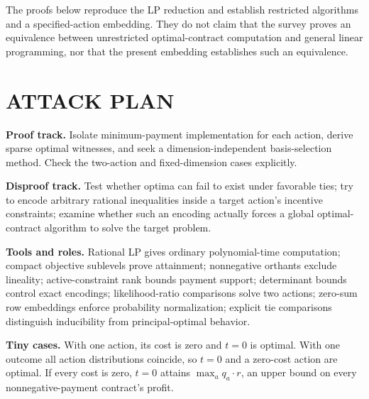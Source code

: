 \documentclass[11pt,a4paper]{article}
\theoremstyle{definition}\newtheorem{definition}[theorem]{Definition}
\theoremstyle{remark}\newtheorem{remark}[theorem]{Remark}
\newcommand{\1}{\mathbf 1}
\begin{document}
The proofs below reproduce the LP reduction and establish restricted algorithms and a specified-action embedding. They do not claim that the survey proves an equivalence between unrestricted optimal-contract computation and general linear programming, nor that the present embedding establishes such an equivalence.

\section{ATTACK PLAN}
\textbf{Proof track.} Isolate minimum-payment implementation for each action, derive sparse optimal witnesses, and seek a dimension-independent basis-selection method. Check the two-action and fixed-dimension cases explicitly.

\textbf{Disproof track.} Test whether optima can fail to exist under favorable ties; try to encode arbitrary rational inequalities inside a target action's incentive constraints; examine whether such an encoding actually forces a global optimal-contract algorithm to solve the target problem.

\textbf{Tools and roles.} Rational LP gives ordinary polynomial-time computation; compact objective sublevels prove attainment; nonnegative orthants exclude lineality; active-constraint rank bounds payment support; determinant bounds control exact encodings; likelihood-ratio comparisons solve two actions; zero-sum row embeddings enforce probability normalization; explicit tie comparisons distinguish inducibility from principal-optimal behavior.

\textbf{Tiny cases.} With one action, its cost is zero and $t=0$ is optimal. With one outcome all action distributions coincide, so $t=0$ and a zero-cost action are optimal. If every cost is zero, $t=0$ attains $\max_a q_a\cdot r$, an upper bound on every nonnegative-payment contract's profit.
\end{document}
